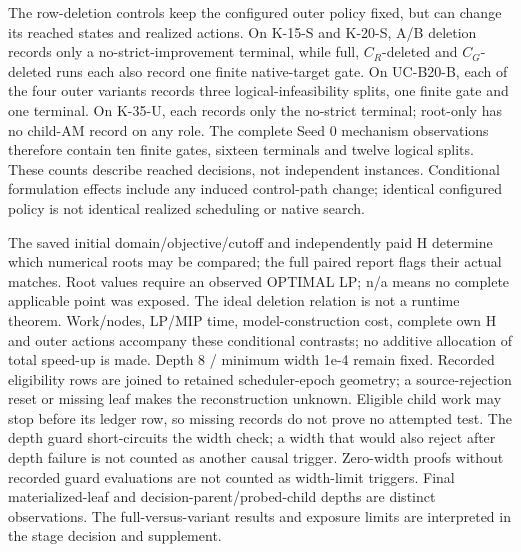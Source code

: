 \documentclass[
  american,
  11pt,
]{article}
\begin{document}
The row-deletion controls keep the configured outer policy fixed, but
can change its reached states and realized actions. On K-15-S and
K-20-S, A/B deletion records only a no-strict-improvement terminal,
while full, \(C_R\)-deleted and \(C_G\)-deleted runs each also record
one finite native-target gate. On UC-B20-B, each of the four outer
variants records three logical-infeasibility splits, one finite gate and
one terminal. On K-35-U, each records only the no-strict terminal;
root-only has no child-AM record on any role. The complete Seed 0
mechanism observations therefore contain ten finite gates, sixteen
terminals and twelve logical splits. These counts describe reached
decisions, not independent instances. Conditional formulation effects
include any induced control-path change; identical configured policy is
not identical realized scheduling or native search.

The saved initial domain/objective/cutoff and independently paid H
determine which numerical roots may be compared; the full paired report
flags their actual matches. Root values require an observed OPTIMAL LP;
n/a means no complete applicable point was exposed. The ideal deletion
relation is not a runtime theorem. Work/nodes, LP/MIP time,
model-construction cost, complete own H and outer actions accompany
these conditional contrasts; no additive allocation of total speed-up is
made. Depth 8 / minimum width 1e-4 remain fixed. Recorded eligibility
rows are joined to retained scheduler-epoch geometry; a source-rejection
reset or missing leaf makes the reconstruction unknown. Eligible child
work may stop before its ledger row, so missing records do not prove no
attempted test. The depth guard short-circuits the width check; a width
that would also reject after depth failure is not counted as another
causal trigger. Zero-width proofs without recorded guard evaluations are
not counted as width-limit triggers. Final materialized-leaf and
decision-parent/probed-child depths are distinct observations. The
full-versus-variant results and exposure limits are interpreted in the
stage decision and supplement.

\clearpage
\end{document}
